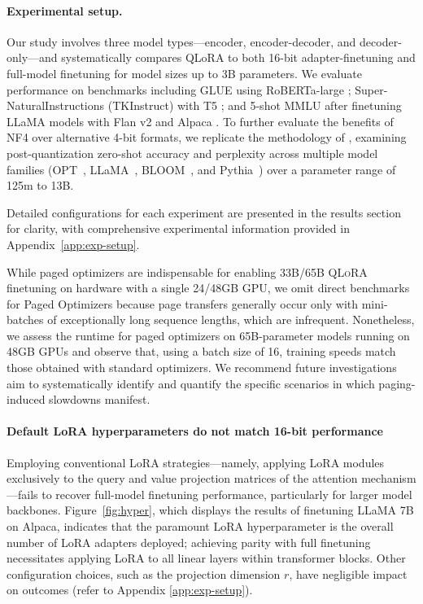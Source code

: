 \paragraph{Experimental setup.} Our study involves three model types—encoder, encoder-decoder, and decoder-only—and systematically compares QLoRA to both 16-bit adapter-finetuning and full-model finetuning for model sizes up to 3B parameters. We evaluate performance on benchmarks including GLUE \citep{wang2018glue} using RoBERTa-large \citep{liu2019roberta}; Super-NaturalInstructions (TKInstruct) \citep{wang2022super} with T5 \citep{t5}; and 5-shot MMLU \citep{hendrycksmeasuring} after finetuning LLaMA models with Flan v2 \citep{longpre2023flan} and Alpaca \citep{alpaca}. To further evaluate the benefits of NF4 over alternative 4-bit formats, we replicate the methodology of \citet{dettmers2022case}, examining post-quantization zero-shot accuracy and perplexity across multiple model families (OPT~\citep{zhang2022opt}, LLaMA~\citep{touvron2023llama}, BLOOM~\citep{scao2022bloom}, and Pythia~\citep{biderman2023pythia}) over a parameter range of 125m to 13B.

Detailed configurations for each experiment are presented in the results section for clarity, with comprehensive experimental information provided in Appendix~\ref{app:exp-setup}.

While paged optimizers are indispensable for enabling 33B/65B \textsc{QLoRA} finetuning on hardware with a single 24/48GB GPU, we omit direct benchmarks for Paged Optimizers because page transfers generally occur only with mini-batches of exceptionally long sequence lengths, which are infrequent. Nonetheless, we assess the runtime for paged optimizers on 65B-parameter models running on 48GB GPUs and observe that, using a batch size of 16, training speeds match those obtained with standard optimizers. We recommend future investigations aim to systematically identify and quantify the specific scenarios in which paging-induced slowdowns manifest.

\paragraph{Default LoRA hyperparameters do not match 16-bit performance} 

Employing conventional LoRA strategies—namely, applying LoRA modules exclusively to the query and value projection matrices of the attention mechanism \citep{hu2021lora}—fails to recover full-model finetuning performance, particularly for larger model backbones. Figure~\ref{fig:hyper}, which displays the results of finetuning LLaMA 7B on Alpaca, indicates that the paramount LoRA hyperparameter is the overall number of LoRA adapters deployed; achieving parity with full finetuning necessitates applying LoRA to all linear layers within transformer blocks. Other configuration choices, such as the projection dimension $r$, have negligible impact on outcomes (refer to Appendix \ref{app:exp-setup}).

